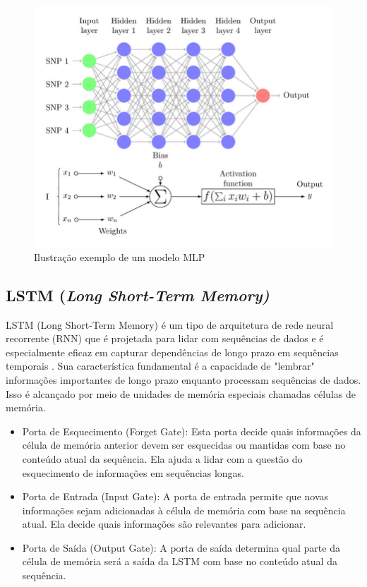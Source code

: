 \begin{figure}[htb]
	\centering
	\begin{minipage}{0.9\linewidth}
		\centering
		\includegraphics[width=\linewidth]{tg1/figuras/Multi-Layer-Perceptron-MLP-diagram-with-four-hidden-layers-and-a-collection-of-single.png}
		\caption{Ilustração exemplo de um modelo MLP
            \cite{mlp_fig}} \label{fig:mlpmodel}
	\end{minipage}
\end{figure}

\subsection{\textbf{LSTM (\textit{Long Short-Term Memory) }}}

LSTM (Long Short-Term Memory) é um tipo de arquitetura de rede neural recorrente (RNN) que é projetada para lidar com sequências de dados e é especialmente eficaz em capturar dependências de longo prazo em sequências temporais \cite{lstm-}. Sua característica fundamental é a capacidade de "lembrar" informações importantes de longo prazo enquanto processam sequências de dados. Isso é alcançado por meio de unidades de memória especiais chamadas células de memória.

\begin{itemize}
    \item Porta de Esquecimento (Forget Gate): Esta porta decide quais informações da célula de memória anterior devem ser esquecidas ou mantidas com base no conteúdo atual da sequência. Ela ajuda a lidar com a questão do esquecimento de informações em sequências longas.
    
    \item Porta de Entrada (Input Gate): A porta de entrada permite que novas informações sejam adicionadas à célula de memória com base na sequência atual. Ela decide quais informações são relevantes para adicionar.
    
    \item Porta de Saída (Output Gate): A porta de saída determina qual parte da célula de memória será a saída da LSTM com base no conteúdo atual da sequência.
    
\end{itemize}


